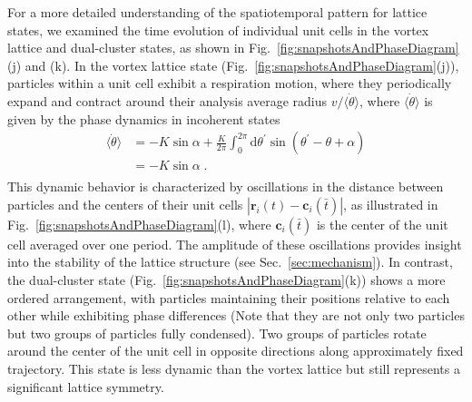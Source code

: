 \documentclass{article}
\begin{document}
For a more detailed understanding of the spatiotemporal pattern for lattice states, we examined the time evolution of individual unit cells in the vortex lattice and dual-cluster states, as shown in Fig.~\ref{fig:snapshotsAndPhaseDiagram}(j) and (k). In the vortex lattice state (Fig.~\ref{fig:snapshotsAndPhaseDiagram}(j)), particles within a unit cell exhibit a respiration motion, where they periodically expand and contract around their analysis average radius $v/\langle \dot{\theta} \rangle$, where $\langle \dot{\theta} \rangle$ is given by the phase dynamics in incoherent states
\begin{equation}
    \begin{aligned}
        \langle \dot{\theta}\rangle &=-K\sin \alpha +\frac{K}{2\pi}\int_0^{2\pi}{\mathrm{d}\theta ^{\prime}\sin \left( \theta ^{\prime}-\theta +\alpha \right)}\\
        &=-K\sin \alpha\;.\\
    \end{aligned}  
\end{equation}
This dynamic behavior is characterized by oscillations in the distance between particles and the centers of their unit cells $\left| \mathbf{r}_i\left( t \right) -\mathbf{c}_i\left( \bar{t} \right) \right|$, as illustrated in Fig.~\ref{fig:snapshotsAndPhaseDiagram}(l), where $\mathbf{c}_i\left( \bar{t} \right)$ is the center of the unit cell averaged over one period. 
The amplitude of these oscillations provides insight into the stability of the lattice structure (see Sec.~\ref{sec:mechanism}). In contrast, the dual-cluster state (Fig.~\ref{fig:snapshotsAndPhaseDiagram}(k)) shows a more ordered arrangement, with particles maintaining their positions relative to each other while exhibiting phase differences (Note that they are not only two particles but two groups of particles fully condensed). Two groups of particles rotate around the center of the unit cell in opposite directions along approximately fixed trajectory.
This state is less dynamic than the vortex lattice but still represents a significant lattice symmetry.


\end{document}
